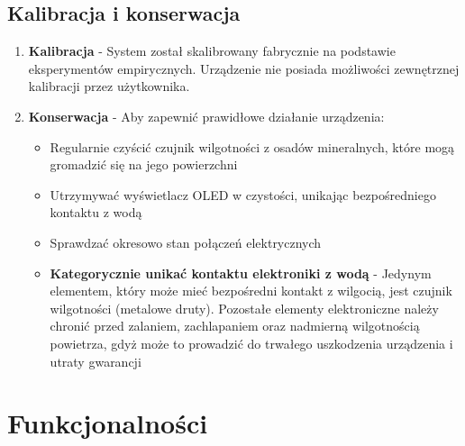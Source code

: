 \documentclass{article}
\begin{document}
\subsection{Kalibracja i konserwacja}
\begin{enumerate}
    \item \textbf{Kalibracja} - System został skalibrowany fabrycznie na podstawie eksperymentów empirycznych. Urządzenie nie posiada możliwości zewnętrznej kalibracji przez użytkownika.
    
    \item \textbf{Konserwacja} - Aby zapewnić prawidłowe działanie urządzenia:
    \begin{itemize}
        \item Regularnie czyścić czujnik wilgotności z osadów mineralnych, które mogą gromadzić się na jego powierzchni
        \item Utrzymywać wyświetlacz OLED w czystości, unikając bezpośredniego kontaktu z wodą
        \item Sprawdzać okresowo stan połączeń elektrycznych
        \item \textbf{Kategorycznie unikać kontaktu elektroniki z wodą} - Jedynym elementem, który może mieć bezpośredni kontakt z wilgocią, jest czujnik wilgotności (metalowe druty). Pozostałe elementy elektroniczne należy chronić przed zalaniem, zachlapaniem oraz nadmierną wilgotnością powietrza, gdyż może to prowadzić do trwałego uszkodzenia urządzenia i utraty gwarancji
    \end{itemize}
\end{enumerate}

\section{Funkcjonalności}




















\end{document}
